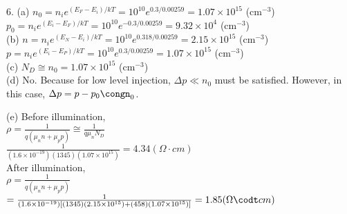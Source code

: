 \documentclass[11pt,oneside,a4paper]{article}
\begin{document}
6.\: (a) \(n_0=n_ie^{(E_F-E_i)/kT}=10^{10}e^{0.3/0.00259}=1.07\times10^{15}\) (cm\(^{-3}\)) \\

\hspace{8.5mm} \(p_0=n_ie^{(E_i-E_F)/kT}=10^{10}e^{-0.3/0.00259}=9.32\times10^4\) (cm\(^{-3}\)) \\

\quad (b) \(n=n_ie^{(E_N-E_i)/kT}=10^{10}e^{0.318/0.00259}=2.15\times10^{15}\) (cm\(^{-3}\)) \\

\hspace{8.5mm} \(p=n_ie^{(E_i-E_P)/kT}=10^{10}e^{0.3/0.00259}=1.07\times10^{15}\) (cm\(^{-3}\)) \\

\quad (c) \(N_D\cong n_0=1.07\times10^{15}\) (cm\(^{-3}\)) \\

\quad (d) No. Because for low level injection, \(\Delta p\ll n_0\) must be satisfied. However, in this case, \(\Delta p=p-p_0\congn_0\).

\quad (e) Before illumination, \\

\hspace{8.5mm} \(\rho=\frac{1}{q(\mu_nn+\mu_pp)}\cong\frac{1}{q\mu_nN_D}\) \\

\hspace{8.5mm}\quad \(\frac{1}{(1.6\times10^{-19})(1345)(1.07\times10^{15})}=4.34 (\Omega\cdot cm)\) \\

\hspace{8.5mm} After illumination, \\

\hspace{8.5mm} \(\rho=\frac{1}{q(\mu_nn+\mu_pp)}\) \\

\hspace{8.5mm}\quad \(=\frac{1}{(1.6\times10^{-19})[(1345)(2.15\times10^{15})+(458)(1.07\times10^{15})]}=1.85 (\Omega\codt cm)\) \\
\end{document}
